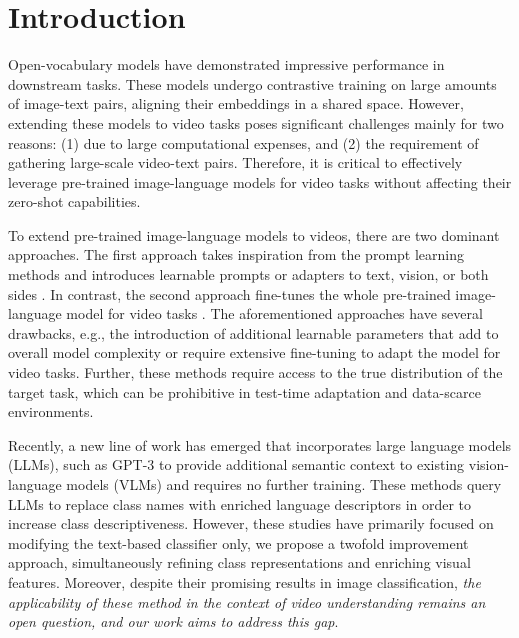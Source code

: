 \documentclass{article} \usepackage{iclr2024_conference,times}
\begin{document}
\section{Introduction}
Open-vocabulary models \citep{roth2023waffling,radford2021learning, jia2021scaling,yuan2021florence} have demonstrated impressive performance in downstream tasks. These models undergo contrastive training on large amounts of image-text pairs, aligning their embeddings in a shared space. However, extending these models to video tasks poses significant challenges mainly for two reasons: (1) due to large computational expenses, and (2) the requirement of gathering large-scale video-text pairs. Therefore, it is critical to effectively leverage pre-trained image-language models for video tasks without affecting their zero-shot capabilities.

To extend pre-trained image-language models to videos, there are two dominant approaches. The first approach takes inspiration from the prompt learning methods \citep{zhou2022learning,zhou2022conditional,jia2022visual} and introduces learnable prompts or adapters to text, vision, or both sides \citep{yang2023aim,wasim2023vita}. In contrast, the second approach fine-tunes the whole pre-trained image-language model for video tasks \citep{Rasheed_2023_CVPR,luo2022clip4clip,wang2021actionclip,ni2022expanding}.  The aforementioned approaches have several drawbacks, e.g., the introduction of additional learnable parameters that add to overall model complexity or require extensive fine-tuning to adapt the model for video tasks. Further, these methods require access to the true distribution of the target task, which can be prohibitive in test-time adaptation and data-scarce environments.


Recently, a new line of work has emerged \citep{menon2022visual,pratt2022does,novack2023chils,roth2023waffling} that incorporates large language models (LLMs), such as GPT-3 to provide additional semantic context to existing vision-language models (VLMs) and requires no further training. These methods query LLMs to replace class names with enriched language descriptors in order to increase class descriptiveness. However, these studies have primarily focused on modifying the text-based classifier only, we propose a twofold improvement approach, simultaneously refining class representations and enriching visual features. Moreover, despite their promising results in image classification, \emph{the applicability of these method in the context of video understanding remains an open question, and our work aims to address this gap}.
\end{document}

